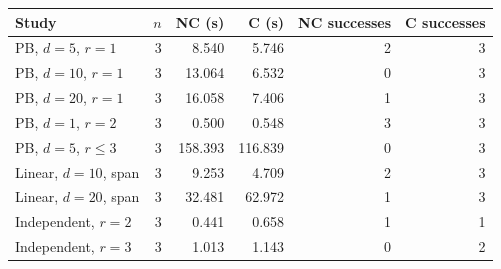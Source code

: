 \begin{tabular}{@{}lrrrrr@{}}
\toprule
Study & $n$ & NC (s) & C (s) & NC successes & C successes\\
\midrule
PB, $d=5$, $r=1$ & 3 & 8.540 & 5.746 & 2 & 3\\
PB, $d=10$, $r=1$ & 3 & 13.064 & 6.532 & 0 & 3\\
PB, $d=20$, $r=1$ & 3 & 16.058 & 7.406 & 1 & 3\\
PB, $d=1$, $r=2$ & 3 & 0.500 & 0.548 & 3 & 3\\
PB, $d=5$, $r\le3$ & 3 & 158.393 & 116.839 & 0 & 3\\
Linear, $d=10$, span & 3 & 9.253 & 4.709 & 2 & 3\\
Linear, $d=20$, span & 3 & 32.481 & 62.972 & 1 & 3\\
Independent, $r=2$ & 3 & 0.441 & 0.658 & 1 & 1\\
Independent, $r=3$ & 3 & 1.013 & 1.143 & 0 & 2\\
\bottomrule
\end{tabular}
